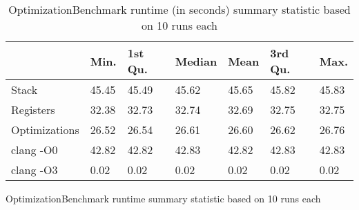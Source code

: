 \begin{table}[h!]
\centering
\begin{tabular}{p{}p{}p{}p{}p{}p{}p{}}
  \hline
 & Min. & 1st Qu. & Median & Mean & 3rd Qu. & Max. \\ 
  \hline
Stack & 45.45 & 45.49 & 45.62 & 45.65 & 45.82 & 45.83 \\ 
  Registers & 32.38 & 32.73 & 32.74 & 32.69 & 32.75 & 32.75 \\ 
  Optimizations & 26.52 & 26.54 & 26.61 & 26.60 & 26.62 & 26.76 \\ 
  clang -O0 & 42.82 & 42.82 & 42.83 & 42.82 & 42.83 & 42.83 \\ 
  clang -O3 & 0.02 & 0.02 & 0.02 & 0.02 & 0.02 & 0.02 \\ 
   \hline
\end{tabular}
\caption{OptimizationBenchmark runtime summary statistic based on 10 runs each}
\caption{OptimizationBenchmark runtime (in seconds) summary statistic based on 10 runs each}
\end{table}

